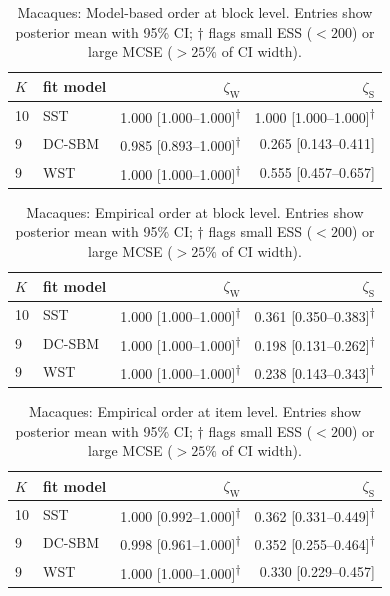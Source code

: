 \begin{table}[htpb]
\centering
\caption{Macaques: Model-based order at block level. Entries show posterior mean with 95\% CI; $\dagger$ flags small ESS ($<200$) or large MCSE ($>25\%$ of CI width).}
\label{tab:macaques_data-model-block}
\begin{tabular}[t]{l l r r}
\toprule
$K$ & fit model & $\zeta_{\mathrm{W}}$ & $\zeta_{\mathrm{S}}$ \\
\midrule
10 & SST & 1.000 [1.000--1.000]\textsuperscript{$\dagger$} & 1.000 [1.000--1.000]\textsuperscript{$\dagger$} \\
9 & DC-SBM & 0.985 [0.893--1.000]\textsuperscript{$\dagger$} & 0.265 [0.143--0.411] \\
9 & WST & 1.000 [1.000--1.000]\textsuperscript{$\dagger$} & 0.555 [0.457--0.657] \\
\bottomrule
\end{tabular}
\end{table}


\begin{table}[htpb]
\centering
\caption{Macaques: Empirical order at block level. Entries show posterior mean with 95\% CI; $\dagger$ flags small ESS ($<200$) or large MCSE ($>25\%$ of CI width).}
\label{tab:macaques_data-emp-block}
\begin{tabular}[t]{l l r r}
\toprule
$K$ & fit model & $\zeta_{\mathrm{W}}$ & $\zeta_{\mathrm{S}}$ \\
\midrule
10 & SST & 1.000 [1.000--1.000]\textsuperscript{$\dagger$} & 0.361 [0.350--0.383]\textsuperscript{$\dagger$} \\
9 & DC-SBM & 1.000 [1.000--1.000]\textsuperscript{$\dagger$} & 0.198 [0.131--0.262]\textsuperscript{$\dagger$} \\
9 & WST & 1.000 [1.000--1.000]\textsuperscript{$\dagger$} & 0.238 [0.143--0.343]\textsuperscript{$\dagger$} \\
\bottomrule
\end{tabular}
\end{table}


\begin{table}[htpb]
\centering
\caption{Macaques: Empirical order at item level. Entries show posterior mean with 95\% CI; $\dagger$ flags small ESS ($<200$) or large MCSE ($>25\%$ of CI width).}
\label{tab:macaques_data-emp-item}
\begin{tabular}[t]{l l r r}
\toprule
$K$ & fit model & $\zeta_{\mathrm{W}}$ & $\zeta_{\mathrm{S}}$ \\
\midrule
10 & SST & 1.000 [0.992--1.000]\textsuperscript{$\dagger$} & 0.362 [0.331--0.449]\textsuperscript{$\dagger$} \\
9 & DC-SBM & 0.998 [0.961--1.000]\textsuperscript{$\dagger$} & 0.352 [0.255--0.464]\textsuperscript{$\dagger$} \\
9 & WST & 1.000 [1.000--1.000]\textsuperscript{$\dagger$} & 0.330 [0.229--0.457] \\
\bottomrule
\end{tabular}
\end{table}


